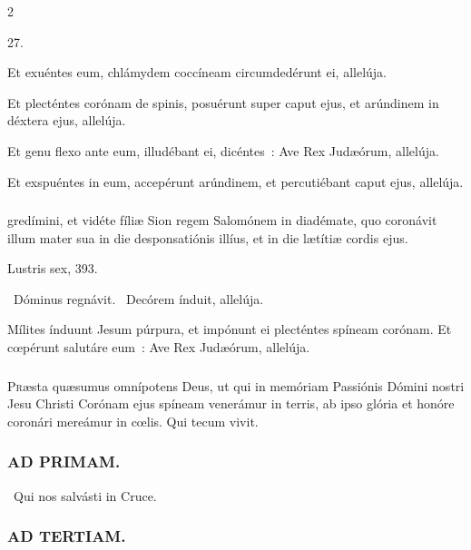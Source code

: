\documentclass[9pt,twoside]{extarticle}
\begin{document}
\begin{multicols}{2}
{{\begin{tightlist}{}
\item {} 27.
\item {} Et exuéntes eum, chlámydem coccíneam circumdedérunt ei, allelúja.
\item {} Et plecténtes corónam de spinis, posuérunt super caput ejus, et arúndinem in déxtera ejus, allelúja.
\item {} Et genu flexo ante eum, illudébant ei, dicéntes~: Ave Rex Judæórum, allelúja.
\item {} Et exspuéntes in eum, accepérunt arúndinem, et percutiébant caput ejus, allelúja.
\end{tightlist}

\subsubsection*{}
gredímini, et vidéte fíliæ Sion regem Salomónem in diadémate, quo coronávit illum mater sua in die desponsatiónis illíus, et in die lætítiæ cordis ejus.

\begin{tightlist}{}
\item {} Lustris sex,  393.
\item {}~Dóminus regnávit. ~Decórem índuit, allelúja.
\item {} Mílites índuunt Jesum púrpura, et impónunt ei plecténtes spíneam corónam. Et cœpérunt salutáre eum~: Ave Rex Judæórum, allelúja.
\end{tightlist}

\subsubsection*{\center {}}
\lettrine{P}ræsta quæsumus omnípotens Deus, ut qui in memóriam Passiónis Dómini nostri Jesu Christi Corónam ejus spíneam venerámur in terris, ab ipso glória et honóre coronári mereámur in cœlis. Qui tecum vivit.

\subsubsection*{\center \textsc{AD PRIMAM.}}
\noindent {}~Qui nos salvásti in Cruce.

\subsubsection*{\center \textsc{AD TERTIAM.}}
}}
\end{multicols}
\end{document}
